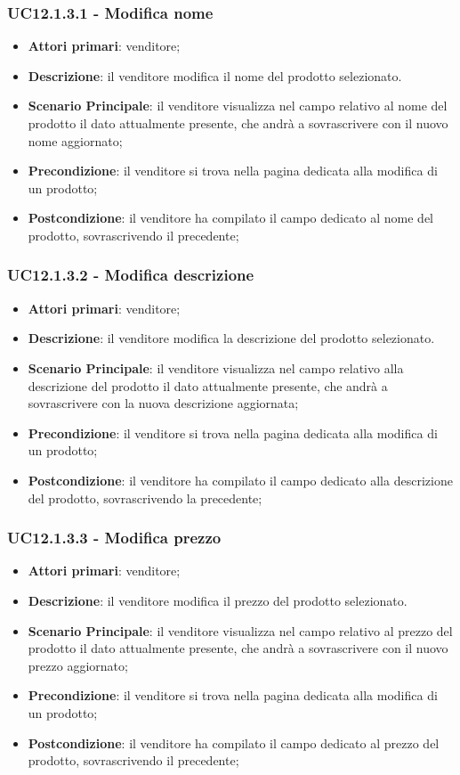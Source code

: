 \subsubsection{UC12.1.3.1 - Modifica nome}
\begin{itemize}
\item \textbf{Attori primari}: venditore;
\item \textbf{Descrizione}: il venditore modifica il nome del prodotto selezionato.
\item \textbf{Scenario Principale}: il venditore visualizza nel campo relativo al nome del prodotto il dato attualmente presente, che andrà a sovrascrivere con il nuovo nome aggiornato;
\item \textbf{Precondizione}: il venditore si trova nella pagina dedicata alla modifica di un prodotto;
\item \textbf{Postcondizione}: il venditore ha compilato il campo dedicato al nome del prodotto, sovrascrivendo il precedente;
\end{itemize}

\subsubsection{UC12.1.3.2 - Modifica descrizione}
\begin{itemize}
\item \textbf{Attori primari}: venditore;
\item \textbf{Descrizione}: il venditore modifica la descrizione del prodotto selezionato.
\item \textbf{Scenario Principale}: il venditore visualizza nel campo relativo alla descrizione del prodotto il dato attualmente presente, che andrà a sovrascrivere con la nuova descrizione aggiornata;
\item \textbf{Precondizione}: il venditore si trova nella pagina dedicata alla modifica di un prodotto;
\item \textbf{Postcondizione}: il venditore ha compilato il campo dedicato alla descrizione del prodotto, sovrascrivendo la precedente;
\end{itemize}

\subsubsection{UC12.1.3.3 - Modifica prezzo}
\begin{itemize}
\item \textbf{Attori primari}: venditore;
\item \textbf{Descrizione}: il venditore modifica il prezzo del prodotto selezionato.
\item \textbf{Scenario Principale}: il venditore visualizza nel campo relativo al prezzo del prodotto il dato attualmente presente, che andrà a sovrascrivere con il nuovo prezzo aggiornato;
\item \textbf{Precondizione}: il venditore si trova nella pagina dedicata alla modifica di un prodotto;
\item \textbf{Postcondizione}: il venditore ha compilato il campo dedicato al prezzo del prodotto, sovrascrivendo il precedente;
\end{itemize}


